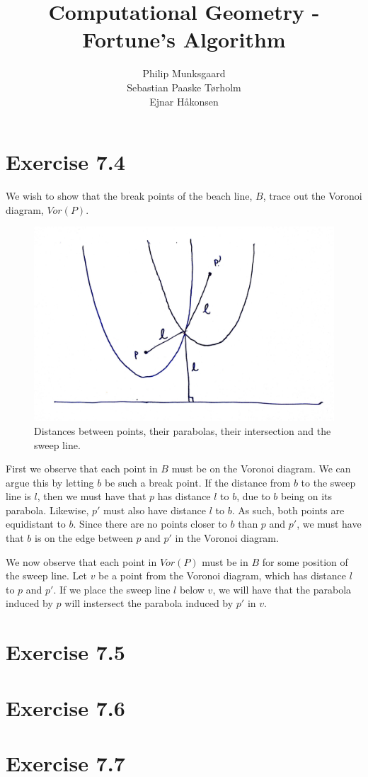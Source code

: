 \documentclass[11pt,a4paper]{article}
\title{Computational Geometry - Fortune's Algorithm}
\author{Philip Munksgaard \\ Sebastian Paaske Tørholm \\ Ejnar Håkonsen}
\begin{document}
\maketitle

\section{Exercise 7.4}
We wish to show that the break points of the beach line, $B$, trace out the Voronoi diagram, $Vor(P)$.

\begin{figure}[h!]
    \centering
    \includegraphics[width=.7\textwidth]{ex74-diagram.jpg}
    \caption{Distances between points, their parabolas, their intersection and the sweep line.}
    \label{ex74:dist}
\end{figure}

First we observe that each point in $B$ must be on the Voronoi diagram. We can
argue this by letting $b$ be such a break point. If the distance from $b$ to
the sweep line is $l$, then we must have that $p$ has distance $l$ to $b$, due
to $b$ being on its parabola. Likewise, $p'$ must also have distance $l$ to
$b$. As such, both points are equidistant to $b$. Since there are no
points closer to $b$ than $p$ and $p'$, %
we must have that $b$ is on the edge between $p$ and $p'$ in the Voronoi diagram.

We now observe that each point in $Vor(P)$ must be in $B$ for some position
of the sweep line. Let $v$ be a point from the Voronoi diagram, which has
distance $l$ to $p$ and $p'$. If we place the sweep line $l$ below $v$, we
will have that the parabola induced by $p$ will instersect the parabola
induced by $p'$ in $v$.

\section{Exercise 7.5}


\section{Exercise 7.6}


\section{Exercise 7.7}
\end{document}
